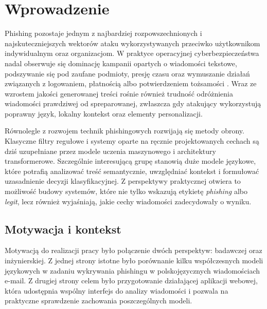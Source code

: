 \documentclass[12pt,a4paper,openany]{report}
\begin{document}

\restoregeometry
\clearpage


\clearpage

\tableofcontents
\clearpage


\chapter{Wprowadzenie}

Phishing pozostaje jednym z najbardziej rozpowszechnionych i najskuteczniejszych wektorów ataku wykorzystywanych przeciwko użytkownikom indywidualnym oraz organizacjom. W praktyce operacyjnej cyberbezpieczeństwa nadal obserwuje się dominację kampanii opartych o wiadomości tekstowe, podszywanie się pod zaufane podmioty, presję czasu oraz wymuszanie działań związanych z logowaniem, płatnością albo potwierdzeniem tożsamości \cite{apwg2023,kaspersky2024}. Wraz ze wzrostem jakości generowanej treści rośnie również trudność odróżnienia wiadomości prawdziwej od spreparowanej, zwłaszcza gdy atakujący wykorzystują poprawny język, lokalny kontekst oraz elementy personalizacji.

Równolegle z rozwojem technik phishingowych rozwijają się metody obrony. Klasyczne filtry regułowe i systemy oparte na ręcznie projektowanych cechach są dziś uzupełniane przez modele uczenia maszynowego i architektury transformerowe. Szczególnie interesującą grupę stanowią duże modele językowe, które potrafią analizować treść semantycznie, uwzględniać kontekst i formułować uzasadnienie decyzji klasyfikacyjnej. Z perspektywy praktycznej otwiera to możliwość budowy systemów, które nie tylko wskazują etykietę \textit{phishing} albo \textit{legit}, lecz również wyjaśniają, jakie cechy wiadomości zadecydowały o wyniku.

\section{Motywacja i kontekst}

Motywacją do realizacji pracy było połączenie dwóch perspektyw: badawczej oraz inżynierskiej. Z jednej strony istotne było porównanie kilku współczesnych modeli językowych w zadaniu wykrywania phishingu w polskojęzycznych wiadomościach e-mail. Z drugiej strony celem było przygotowanie działającej aplikacji webowej, która udostępnia wspólny interfejs do analizy wiadomości i pozwala na praktyczne sprawdzenie zachowania poszczególnych modeli.
\end{document}

